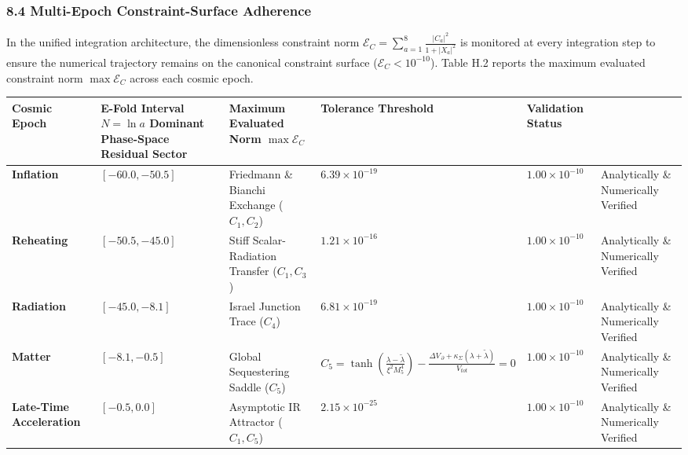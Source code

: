\documentclass[aps,prd,onecolumn,superscriptaddress,nofootinbib,longbibliography,10pt]{revtex4-2}
\begin{document}
\subsubsection*{8.4 Multi-Epoch Constraint-Surface Adherence}

  In the unified integration architecture, the dimensionless constraint norm \(\mathcal{E}_C = \sum_{a=1}^8 \frac{|C_a|^2}{1 + |X_a|^2}\) is monitored at every integration step to ensure the numerical trajectory remains on the canonical constraint surface (\(\mathcal{E}_C < 10^{-10}\)). Table H.2 reports the maximum evaluated constraint norm \(\max\mathcal{E}_C\) across each cosmic epoch.



  
\begin{center}
\begin{tabular}{|llllll|}
\hline

      Cosmic Epoch & E-Fold Interval \(N = \ln a\)
        Dominant Phase-Space Residual Sector & Maximum Evaluated Norm \(\max\mathcal{E}_C\) & Tolerance Threshold & Validation Status
       \\ \hline

    
    
      \textbf{Inflation} & \([-60.0, -50.5]\) & Friedmann \& Bianchi Exchange (\(C_1, C_2\)) & \(6.39 \times 10^{-19}\) & \(1.00 \times 10^{-10}\) & Analytically \& Numerically Verified \\ \hline

      \textbf{Reheating} & \([-50.5, -45.0]\) & Stiff Scalar-Radiation Transfer (\(C_1, C_3\)) & \(1.21 \times 10^{-16}\) & \(1.00 \times 10^{-10}\) & Analytically \& Numerically Verified \\ \hline

      \textbf{Radiation} & \([-45.0, -8.1]\) & Israel Junction Trace (\(C_4\)) & \(6.81 \times 10^{-19}\) & \(1.00 \times 10^{-10}\) & Analytically \& Numerically Verified \\ \hline

      \textbf{Matter} & \([-8.1, -0.5]\) & Global Sequestering Saddle (\(C_5\)) & \(\displaystyle C_{5} = \tanh\!\left(\frac{\lambda - \tilde{\lambda}}{\xi^{2}M_{5}^{4}}\right) - \frac{\Delta V_{\,\partial} + \kappa_{\Sigma}(\lambda + \tilde{\lambda})}{V_{tot}} = 0\) & \(1.00 \times 10^{-10}\) & Analytically \& Numerically Verified \\ \hline

      \textbf{Late-Time Acceleration} & \([-0.5, 0.0]\) & Asymptotic IR Attractor (\(C_1, C_5\)) & \(2.15 \times 10^{-25}\) & \(1.00 \times 10^{-10}\) & Analytically \& Numerically Verified \\ \hline

    
  \end{tabular}
\end{center}
\end{document}
